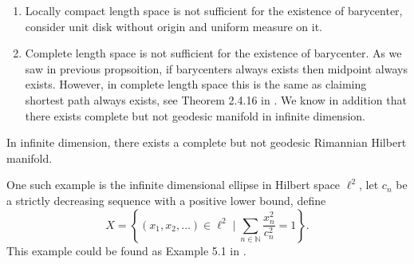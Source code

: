 \begin{rmk}
	\begin{enumerate}
		\item Locally compact length space is not sufficient for the existence of barycenter, consider unit disk without origin and uniform measure on it.
		\item Complete length space is not sufficient for the existence of barycenter. As we saw in previous propsoition, if barycenters always exists then midpoint always exists. However, in complete length space this is the same as claiming shortest path always exists, see Theorem 2.4.16 in \cite{burago2001course}. We know in addition that there exists complete but not geodesic manifold in infinite dimension.
	\end{enumerate}
\end{rmk}

\begin{lem}
	In infinite dimension, there exists a complete but not geodesic Rimannian Hilbert manifold.
\end{lem}

One such example is the infinite dimensional ellipse in Hilbert space $\ell^2$, let $c_n$ be a strictly decreasing sequence with a positive lower bound, define
\[
	X = \left\{ \left( x _ { 1 } , x _ { 2 } , \ldots \right) \in \ell^2 \mid \sum _ { n \in \mathbb { N } } \frac { x _ { n } ^ { 2 } } { c _ { n } ^ { 2 } } = 1 \right\}.
\]
This example could be found as Example 5.1 in \cite{grossman1965hilbert}.

